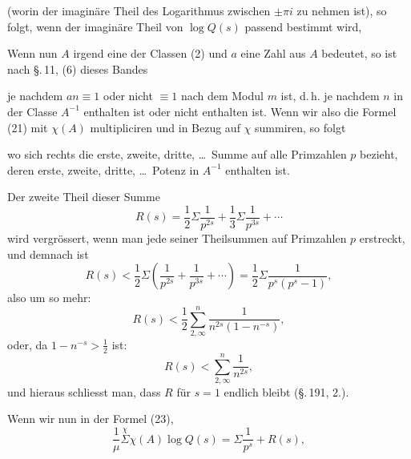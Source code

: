 (worin der imaginäre Theil des Logarithmus zwischen $\pm \pi i$ zu nehmen ist), so folgt, wenn der imaginäre Theil von $\log Q(s)$ passend bestimmt wird,


Wenn nun $A$ irgend eine der Classen (2) und $a$ eine Zahl aus $A$ bedeutet, so ist nach \S.\,11, (6) dieses Bandes


je nachdem $an \equiv 1$ oder nicht $\equiv 1$ nach dem Modul $m$ ist, d.\,h. je nachdem $n$ in der Classe $A^{-1}$ enthalten ist oder nicht enthalten ist. Wenn wir also die Formel (21) mit $\chi(A)$ multipliciren und in Bezug auf $\chi$ summiren, so folgt


wo sich rechts die erste, zweite, dritte, \ldots\ Summe auf alle Primzahlen $p$ bezieht, deren erste, zweite, dritte, \ldots\ Potenz in $A^{-1}$ enthalten ist.

Der zweite Theil dieser Summe
\[
R(s) = \frac{1}{2}\Sigma \frac{1}{p^{2s}} + \frac{1}{3}\Sigma \frac{1}{p^{3s}} + \cdots
\]
wird vergrössert, wenn man jede seiner Theilsummen auf  Primzahlen $p$ erstreckt, und demnach ist
\[
R(s) < \frac{1}{2}\Sigma \left(\frac{1}{p^{2s}} + \frac{1}{p^{3s}} + \cdots\right) = \frac{1}{2}\Sigma \frac{1}{p^s (p^s - 1)},
\]
also um so mehr:
\[
R(s) < \frac{1}{2} \sum_{2,\infty}^{n} \frac{1}{n^{2s} (1 - n^{-s})},
\]
oder, da $1 - n^{-s} > \frac{1}{2}$ ist:
\[
R(s) < \sum_{2,\infty}^{n} \frac{1}{n^{2s}},
\]
und hieraus schliesst man, dass $R$ für $s = 1$ endlich bleibt (\S.\,191, 2.).

Wenn wir nun in der Formel (23),
\[
\frac{1}{\mu} \overset{\chi}{\Sigma} \chi(A) \log Q(s) = \Sigma \frac{1}{p^s} + R(s),
\]
